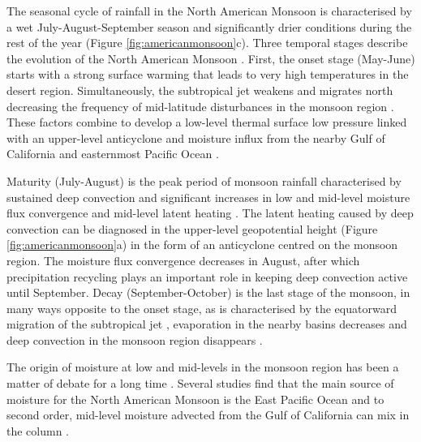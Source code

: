  The seasonal cycle of rainfall in the North American Monsoon is characterised by a wet July-August-September season and significantly drier conditions during the rest of the year \citep{adams1997} (Figure \ref{fig:americanmonsoon}c).
Three temporal stages describe the evolution of the North American Monsoon \citep{adams1997,geil2013}.
First, the onset stage (May-June) starts with a strong surface warming that leads to very high temperatures in the desert region.
Simultaneously, the subtropical jet weakens and migrates north decreasing the frequency of mid-latitude disturbances in the monsoon region \citep{douglas1993,turrent2009}.
These factors combine to develop a low-level thermal surface low pressure linked with an upper-level anticyclone and  moisture influx from the nearby Gulf of California and easternmost Pacific Ocean \citep{douglas1993,geil2013}.

Maturity (July-August) is the peak period of monsoon rainfall characterised by sustained deep convection \citep{barlow1998} and significant increases in low and mid-level moisture flux convergence and mid-level latent heating \citep{adams1997,cook2013}. The latent heating caused by deep convection can be diagnosed in the upper-level geopotential height (Figure \ref{fig:americanmonsoon}a) in the form of an anticyclone centred on the monsoon region. 
The moisture flux convergence decreases in August, after which precipitation recycling \citep{dominguez2008} plays an important role in keeping deep convection active until September.
 Decay (September-October) is the last stage of the monsoon, in many ways opposite to the onset stage, as is characterised by the equatorward migration of the subtropical jet \citep{higgins1997,geil2013}, evaporation in the nearby basins decreases and deep convection in the monsoon region disappears \citep{douglas1993}.

 The origin of moisture at low and mid-levels in the monsoon region has been a matter of debate for a long time \citep{adams1997,barlow1998,vera2006,ordonez2019}.
Several studies find that the main source of moisture for the North American Monsoon is the East Pacific Ocean and to second order, mid-level moisture advected from the Gulf of California can mix in the column \citep[e.g.][]{adams1997,stensrud1997,vera2006,turrent2009,ordonez2019}.


